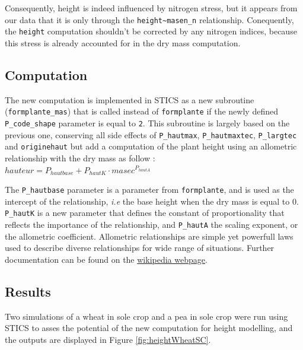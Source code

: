 \documentclass[]{book}
\begin{document}
Consequently, height is indeed influenced by nitrogen stress, but it appears from our data that it is only through the \texttt{height\textasciitilde{}masen\_n} relationship. Conequently, the \texttt{height} computation shouldn't be corrected by any nitrogen indices, because this stress is already accounted for in the dry mass computation.

\hypertarget{computation}{%
\subsection{Computation}\label{computation}}

The new computation is implemented in STICS as a new subroutine (\texttt{formplante\_mas}) that is called instead of \texttt{formplante} if the newly defined \texttt{P\_code\_shape} parameter is equal to \texttt{2}. This subroutine is largely based on the previous one, conserving all side effects of \texttt{P\_hautmax}, \texttt{P\_hautmaxtec}, \texttt{P\_largtec} and \texttt{originehaut} but add a computation of the plant height using an allometric relationship with the dry mass as follow :\\
\(hauteur= P_{hautbase} + P_{hautK} \cdot masec^{P_{hautA}}\)

The \texttt{P\_hautbase} parameter is a parameter from \texttt{formplante}, and is used as the intercept of the relationship, \emph{i.e} the base height when the dry mass is equal to 0. \texttt{P\_hautK} is a new parameter that defines the constant of proportionality that reflects the importance of the relationship, and \texttt{P\_hautA} the scaling exponent, or the allometric coefficient. Allometric relationships are simple yet powerfull laws used to describe diverse relationships for wide range of situations. Further documentation can be found on the \href{https://en.wikipedia.org/wiki/Allometry}{wikipedia webpage}.

\hypertarget{results-1}{%
\subsection{Results}\label{results-1}}

Two simulations of a wheat in sole crop and a pea in sole crop were run using STICS to asses the potential of the new computation for height modelling, and the outputs are displayed in Figure \ref{fig:heightWheatSC}.
\end{document}
